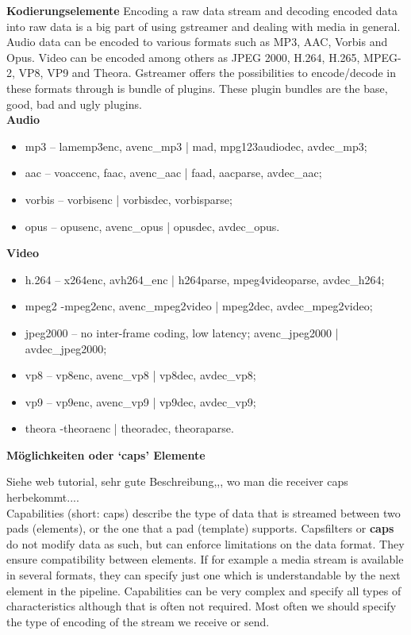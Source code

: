 \textbf{Kodierungselemente}
Encoding a raw data stream and decoding encoded data into raw data is a big part of using gstreamer and dealing with media in general. Audio data can be encoded to various formats such as MP3, AAC, Vorbis and Opus. Video can be encoded among others as JPEG 2000, H.264, H.265, MPEG-2, VP8, VP9 and Theora. Gstreamer offers the possibilities to encode/decode in these formats through is bundle of plugins. These plugin bundles are the base, good, bad and ugly plugins.\\

\textbf{Audio}
\begin{itemize}
\item mp3 – lamemp3enc, avenc\_mp3 | mad, mpg123audiodec, avdec\_mp3; 
\item aac – voaccenc, faac, avenc\_aac | faad, aacparse, avdec\_aac;
\item vorbis – vorbisenc | vorbisdec, vorbisparse;
\item opus – opusenc, avenc\_opus | opusdec, avdec\_opus.
\end{itemize}

\textbf{Video}
\begin{itemize}
\item h.264 – x264enc, avh264\_enc |  h264parse, mpeg4videoparse, avdec\_h264;
\item mpeg2 -mpeg2enc, avenc\_mpeg2video | mpeg2dec, avdec\_mpeg2video;
\item jpeg2000 – no inter-frame coding, low latency; avenc\_jpeg2000 | avdec\_jpeg2000;
\item vp8 – vp8enc, avenc\_vp8 | vp8dec, avdec\_vp8;
\item vp9 – vp9enc, avenc\_vp9 | vp9dec, avdec\_vp9;
\item theora -theoraenc | theoradec, theoraparse.
\end{itemize}

\textbf{Möglichkeiten oder ‘caps’ Elemente}

Siehe web tutorial, sehr gute Beschreibung,,, wo man die receiver caps herbekommt....\\

Capabilities (short: caps) describe the type of data that is streamed between two pads (elements), or the one that a pad (template) supports. Capsfilters or \textbf{caps} do not modify data as such, but can enforce limitations on the data format. They ensure compatibility between elements. If for example a media stream is available in several formats, they can specify just one which is understandable by the next element in the pipeline. Capabilities can be very complex and specify all types of characteristics although that is often not required. Most often we should specify the type of encoding of the stream we receive or send.\\

